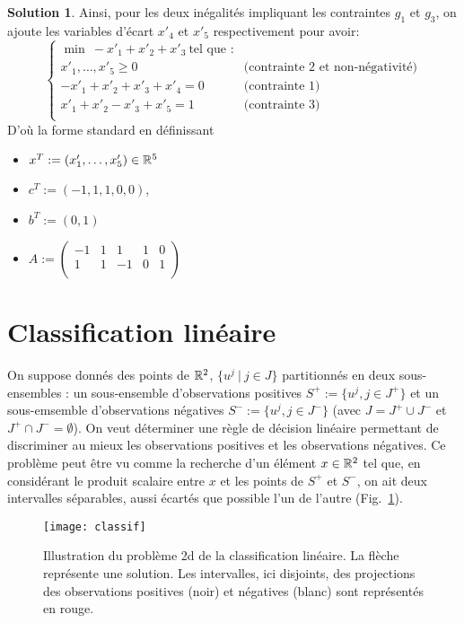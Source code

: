\documentclass[a4paper,francais]{article}
\newcommand{\R}{{\ensuremath\mathbb{R}}}
\theoremstyle{definition}
\newtheorem*{solution}{Solution}
\begin{document}
\begin{solution}
  Ainsi, pour les deux inégalités impliquant les contraintes $g_1$ et $g_3$,
  on ajoute les variables d'écart $x'_4$ et $x'_5$ respectivement pour avoir: 
  \[
  \left\{
  \begin{array}{cl}
    \min \ -x'_1 + x'_2 + x'_3 \ \text{tel que :} & \\
    x'_1, \dots, x'_5 \geq 0 & \text{(contrainte 2 et non-négativité)} \\
    -x'_1 + x'_2 + x'_3 + x'_4  = 0 & \text{(contrainte 1)} \\
    x'_1 + x'_2 - x'_3 + x'_5 = 1   & \text{(contrainte 3)} \\
  \end{array}
  \right.
  \]
  D'où la forme standard en définissant
  \begin{itemize}
  \item $x^T := (x'_1, \dots, x'_5) \in \R^5$
  \item $c^T := (-1, 1, 1, 0, 0)$,
  \item $b^T := (0, 1)$
  \item $A :=
    \left(
    \begin{array}{cccccc}
      -1 & 1 & 1 & 1 & 0 \\
      1 & 1 & -1 & 0 & 1 \\
    \end{array}
    \right)$
  \end{itemize}
\end{solution}

\section{Classification linéaire}
\label{sec:classif}

On suppose donnés des points de $\R^2$, $\{u^j \ | \ {j \in J} \}$ partitionnés en deux sous-ensembles :
un sous-ensemble d'observations positives $S^+ := \{ u^j, j \in J^+ \}$ et un sous-emsemble
d'observations négatives $S^- := \{ u^j, j \in J^- \}$
(avec $J = J^+ \cup J^-$ et $J^+ \cap J^- = \emptyset$).
On veut déterminer une règle de décision linéaire permettant de discriminer au mieux
les observations positives et les observations négatives. Ce problème peut être vu comme la recherche
d'un élément $x \in \R^2$ tel que, en considérant le produit scalaire entre $x$ et les points de $S^+$ et $S^-$,
on ait deux intervalles séparables, aussi écartés que possible l'un de l'autre (Fig.~\ref{fig:classif}).

\begin{figure}[htbp]
  \centering
  \texttt{[image: classif]}
  \caption{Illustration du problème 2d de la classification linéaire.
    La flèche représente une solution.
    Les intervalles, ici disjoints, des projections des observations
    positives (noir) et négatives (blanc) sont représentés en rouge.  }
  \label{fig:classif}
\end{figure}
\end{document}
